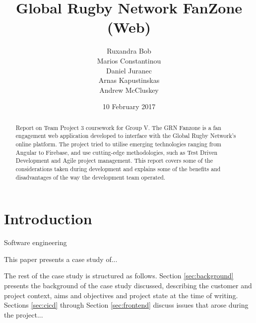 \documentclass{l3proj}
\begin{document}
\title{Global Rugby Network FanZone (Web)}

\author{Ruxandra Bob \\
		Marios Constantinou \\
        Daniel Juranec \\
        Arnas Kapustinskas \\
        Andrew McCluskey}

\date{10 February 2017}

\maketitle

\begin{abstract}

Report on Team Project 3 coursework for Group V. The GRN Fanzone is a
 fan engagement web application developed to interface with the Global Rugby
 Network's online platform. The project tried to utilise 
 emerging technologies ranging from Angular to Firebase, and use
 cutting-edge methodologies, such as Test Driven Development and Agile
 project management. This report covers some of the considerations taken
 during development and explains some of the benefits and disadvantages
 of the way the development team operated.

\end{abstract}

\educationalconsent

\newpage

\section{Introduction}

Software engineering

This paper presents a case study of...


The rest of the case study is structured as follows.  Section
\ref{sec:background} presents the background of the case study
discussed, describing the customer and project context, aims and
objectives and project state at the time of writing.  Sections
\ref{sec:cicd} through Section \ref{sec:frontend} discuss issues that
arose during the project...

\end{document}
